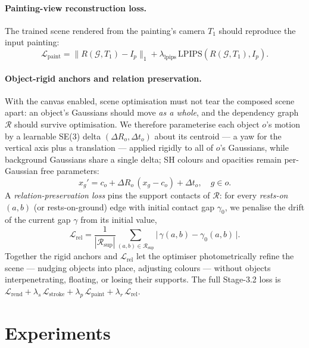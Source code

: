\documentclass[10pt,twocolumn,letterpaper]{article}
\begin{document}
\paragraph{Painting-view reconstruction loss.}
The trained scene rendered from the painting's camera $T_1$ should reproduce
the input painting:
\begin{equation}
\mathcal{L}_\text{paint} = \|R(\mathcal{G}, T_1) - I_p\|_1 + \lambda_\text{lpips}\,
\mathrm{LPIPS}(R(\mathcal{G}, T_1), I_p).
\end{equation}

\paragraph{Object-rigid anchors and relation preservation.}
With the canvas enabled, scene optimisation must not tear the composed scene
apart: an object's Gaussians should move \emph{as a whole}, and the
dependency graph $\mathcal{R}$ should survive optimisation. We therefore
parameterise each object $o$'s motion by a learnable SE(3) delta
$(\Delta R_o, \Delta t_o)$ about its centroid --- a yaw for the vertical axis
plus a translation --- applied rigidly to all of $o$'s Gaussians, while
background Gaussians share a single delta; SH colours and opacities remain
per-Gaussian free parameters:
\begin{equation}
x_g' = c_o + \Delta R_o\,(x_g - c_o) + \Delta t_o, \quad g \in o.
\end{equation}
A \emph{relation-preservation loss} pins the support contacts of
$\mathcal{R}$: for every \emph{rests-on}$(a,b)$ (or rests-on-ground) edge
with initial contact gap $\gamma_0$, we penalise the drift of the current
gap $\gamma$ from its initial value,
\begin{equation}
\mathcal{L}_\text{rel} =
\frac{1}{|\mathcal{R}_\text{sup}|}
\sum_{(a,b)\in\mathcal{R}_\text{sup}}
\big|\,\gamma(a,b) - \gamma_0(a,b)\,\big|.
\end{equation}
Together the rigid anchors and $\mathcal{L}_\text{rel}$ let the optimiser
photometrically refine the scene --- nudging objects into place, adjusting
colours --- without objects interpenetrating, floating, or losing their
supports. The full Stage-3.2 loss is
$\mathcal{L}_\text{rend} + \lambda_s\, \mathcal{L}_\text{stroke} + \lambda_p\,
\mathcal{L}_\text{paint} + \lambda_r\, \mathcal{L}_\text{rel}$.

\section{Experiments}
\label{sec:experiments}
\end{document}
